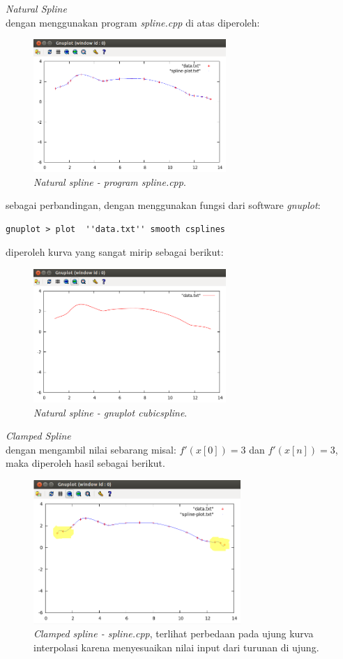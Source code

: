 \documentclass[paper=a4, fontsize=11pt]{scrartcl}
\numberwithin{equation}{section} %
\numberwithin{figure}{section} %
\numberwithin{table}{section} %
\begin{document}
\textit{Natural Spline}\\
dengan menggunakan program \textit{spline.cpp} di atas diperoleh:
\begin{figure}
	\centering
	\includegraphics[width=0.65\textwidth]
		{natural-burung.png}
	\caption{\textit{Natural spline - program spline.cpp}.}
\end{figure}

\newpage
sebagai perbandingan, dengan menggunakan fungsi dari software \textit{gnuplot}:
\begin{verbatim} 
gnuplot > plot  ''data.txt'' smooth csplines 
\end{verbatim} 
diperoleh kurva yang sangat mirip sebagai berikut:
\begin{figure}
	\centering
	\includegraphics[width=0.65\textwidth]
		{gnuplot-burung-natural.png}
	\caption{\textit{Natural spline - gnuplot cubicspline}.}
\end{figure}

\textit{Clamped Spline}\\
dengan mengambil nilai sebarang misal: $f'(x[0]) = 3$ dan $f'(x[n]) = 3$, maka diperoleh hasil sebagai berikut.
\begin{figure}
	\centering
	\includegraphics[width=0.7\textwidth]
		{clamped-burung.png}
	\caption{\textit{Clamped spline - spline.cpp}, terlihat perbedaan pada ujung kurva interpolasi karena menyesuaikan nilai input dari turunan di ujung.}
\end{figure}
\end{document}
